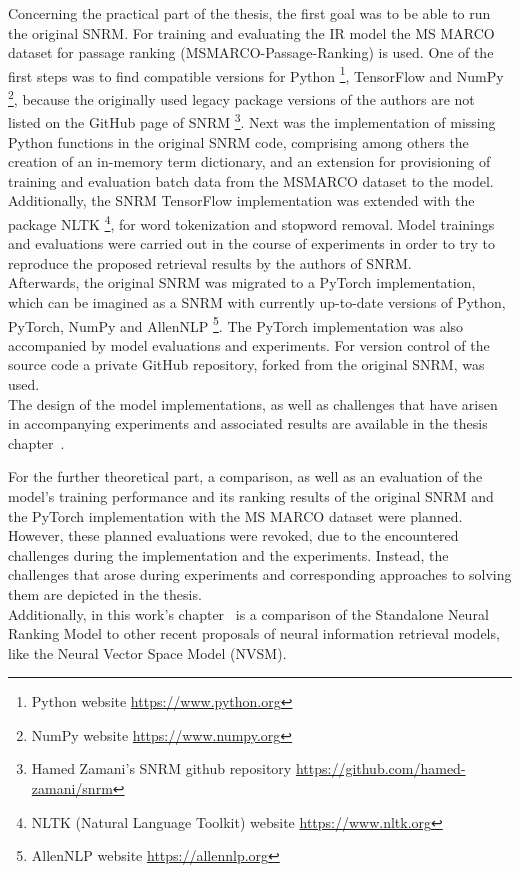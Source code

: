 Concerning the practical part of the thesis, the first goal was to be able 
    to run the original SNRM.
For training and evaluating the IR model the MS MARCO dataset
    for passage ranking (MSMARCO-Passage-Ranking) is used.
One of the first steps was to find compatible
    versions for Python 
    \footnote{Python website \url{https://www.python.org}}, 
    TensorFlow and NumPy
    \footnote{NumPy website \url{https://www.numpy.org}},
    because the originally used legacy package versions of the authors are not
    listed on the GitHub page of SNRM 
    \footnote{Hamed Zamani's SNRM github repository \url{https://github.com/hamed-zamani/snrm}}.
Next was the implementation of missing Python functions in the original SNRM code, 
    comprising among others the creation of an in-memory term dictionary,
    and an extension for provisioning of training and evaluation batch data from the 
    MSMARCO dataset to the model.
Additionally, the SNRM TensorFlow implementation was extended with the package NLTK
    \footnote{NLTK (Natural Language Toolkit) website \url{https://www.nltk.org}},
    for word tokenization and stopword removal.
Model trainings and evaluations were carried out in the course of experiments 
    in order to try to reproduce the proposed retrieval results by the authors of SNRM.\\
Afterwards, the original SNRM was migrated to a PyTorch implementation,
    which can be imagined as a SNRM with currently up-to-date versions of 
    Python, PyTorch, NumPy and AllenNLP
    \footnote{AllenNLP website \url{https://allennlp.org}}.
The PyTorch implementation was also accompanied by model evaluations and experiments.
For version control of the source code a private GitHub repository, forked from 
    the original SNRM, was used.\\
The design of the model implementations, as well as 
    challenges that have arisen in accompanying experiments and associated results 
    are available in the 
    thesis chapter~.

For the further theoretical part, a comparison, as well as an evaluation of the model's
    training performance and its ranking results of the original SNRM and 
    the PyTorch implementation with the MS MARCO dataset 
    were planned. 
However, these planned evaluations were revoked,
    due to the encountered challenges during the implementation and the experiments.
Instead, the challenges that arose during experiments 
    and corresponding approaches to solving them are depicted in the thesis.\\
Additionally, in this work's chapter~ 
    is a comparison of the Standalone Neural Ranking Model to other 
    recent proposals of neural information retrieval models,
    like the Neural Vector Space Model (NVSM).

